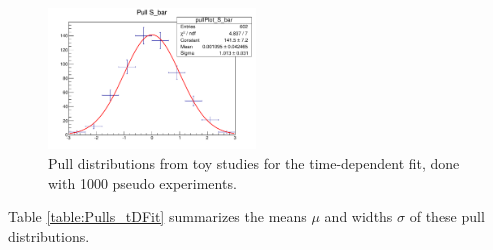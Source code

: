 \begin{figure}[h]
\includegraphics[height=!,width=0.49\textwidth]{figs/plots_toy/studies_timeFit/pull_S_bar_all_Gaussfit.pdf}
\caption{Pull distributions from toy studies for the time-dependent fit, done with 1000 pseudo experiments.}
\label{fig:ToyPulls_tdfit}
\end{figure}





Table \ref{table:Pulls_tDFit} summarizes the means $\mu$ and widths $\sigma$ of these pull distributions.

